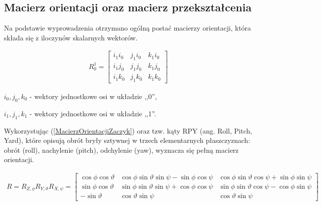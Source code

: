 \subsection{Macierz orientacji oraz macierz przekształcenia}

Na podstawie wyprowadzenia \cite{Zaczyk} otrzymano ogólną postać macierzy orientacji, która składa się z iloczynów skalarnych wektorów.



\begin{eqnarray}
\label{MacierzOrientacjiZaczyk}
R_{0}^{1}
=
\begin{bmatrix}
i_{1}i_{0} & j_{1}i_{0} & k_{1}i_{0}\\
i_{1}j_{0} & j_{1}j_{0} & k_{1}j_{0} \\
i_{1}k_{0} & j_{1}k_{0} & k_{1}k_{0}
\end{bmatrix}
\end{eqnarray}

\begin{eqwhere}[2cm]
	\item $i_{0}, j_{0}, k_{0}$ - wektory jednostkowe osi w układzie ,,0'',
	\item $i_{1}, j_{1}, k_{1}$ - wektory jednostkowe osi w układzie ,,1''.
\end{eqwhere}


Wykorzystując (\ref{MacierzOrientacjiZaczyk}) oraz tzw. kąty RPY (ang. Roll, Pitch, Yard), które opisują obrót bryły sztywnej w trzech elementarnych płaszczyznach: obrót (roll), nachylenie (pitch), odchylenie (yaw),  wyznacza się pełną macierz orientacji. 


\begin{eqnarray}
\label{MacierzRPY}
R = R_{Z,\phi}R_{Y,\vartheta}R_{X,\psi}
=
\begin{bmatrix}
\cos\phi\cos\vartheta & 
\cos\phi\sin\vartheta\sin\psi - \sin\phi\cos\psi & 
\cos\phi\sin\vartheta\cos\psi + \sin\phi\sin\psi\\
\sin\phi\cos\vartheta & 
\sin\phi\sin\vartheta\sin\psi + \cos\phi\cos\psi & 
\sin\phi\sin\vartheta\cos\psi - \cos\phi\sin\psi\\
-\sin\vartheta & 
\cos\vartheta\sin\psi & 
\cos\vartheta\sin\psi
\end{bmatrix}
\end{eqnarray}


